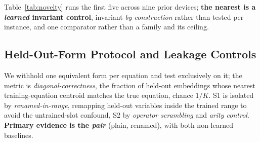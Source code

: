 \noindent Table~\ref{tab:novelty} runs the first five across nine prior devices; \textbf{the nearest is a \emph{learned} invariant control}, invariant \emph{by construction} rather than tested per instance, and one comparator rather than a family and its ceiling.

\subsection{Held-Out-Form Protocol and Leakage Controls}

We withhold one equivalent form per equation and test exclusively on it; the metric is \emph{diagonal-correctness}, the fraction of held-out embeddings whose nearest training-equation centroid matches the true equation, chance $1/K$. S1 is isolated by \emph{renamed-in-range}, remapping held-out variables inside the trained range to avoid the untrained-slot confound, S2 by \emph{operator scrambling} and \emph{arity control}. \textbf{Primary evidence is the \emph{pair}} (plain, renamed), with both non-learned baselines.

